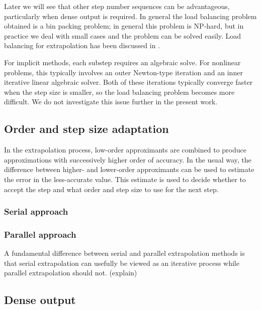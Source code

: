 \documentclass[12pt]{article}
\begin{document}
Later we will see that other step number sequences can be advantageous,
particularly when dense output is required.  In general the load balancing
problem obtained is a bin packing problem;
in general this problem is NP-hard, but in practice we deal with small cases
and the problem can be solved easily.  
Load balancing for extrapolation has been discussed in \cite{VanderHouwen1990,Rauber1997}.

For implicit methods, each substep requires an algebraic solve.
For nonlinear problems, this typically involves an outer Newton-type
iteration and an inner iterative linear algebraic solver.
Both of these iterations typically converge faster when the
step size is smaller, so the load balancing problem becomes more
difficult.  We do not investigate this issue further in the present
work.


\subsection{Order and step size adaptation}
In the extrapolation process, low-order approximants are combined
to produce approximations with successively higher order of accuracy.
In the usual way, the difference between higher- and lower-order
approximants can be used to estimate the error in the less-accurate
value.  This estimate is used to decide whether to accept the step
and what order and step size to use for the next step.

\subsubsection{Serial approach}
\subsubsection{Parallel approach}
A fundamental difference between serial and parallel extrapolation
methods is that serial extrapolation can usefully be viewed as
an iterative process while parallel extrapolation should not.
(explain)

\subsection{Dense output}
\end{document}

